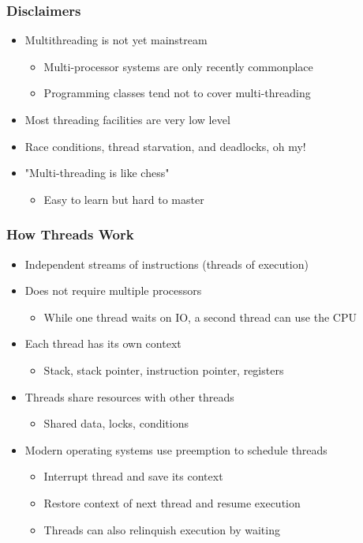 \begin{slide}
\frametitle{Disclaimers}

\begin{itemize}
\item Multithreading is not yet mainstream
  \begin{itemize}
  \item Multi-processor systems are only recently commonplace
  \item Programming classes tend not to cover multi-threading
  \end{itemize}
\item Most threading facilities are very low level
\item Race conditions, thread starvation, and deadlocks, oh my!
\item "Multi-threading is like chess"
  \begin{itemize}
  \item Easy to learn but hard to master
  \end{itemize}
\end{itemize}

\end{slide}


\begin{slide}
\frametitle{How Threads Work}

\begin{itemize}
\item Independent streams of instructions (threads of execution)
\item Does not require multiple processors
  \begin{itemize}
  \item While one thread waits on IO, a second thread can use the CPU
  \end{itemize}
\item Each thread has its own context
  \begin{itemize}
  \item Stack, stack pointer, instruction pointer, registers
  \end{itemize}
\item Threads share resources with other threads
  \begin{itemize}
  \item Shared data, locks, conditions
  \end{itemize}
\vspace{1em}
\item Modern operating systems use preemption to schedule threads
  \begin{itemize}
  \item Interrupt thread and save its context
  \item Restore context of next thread and resume execution
  \item Threads can also relinquish execution by waiting
  \end{itemize}
\end{itemize}

\end{slide}


